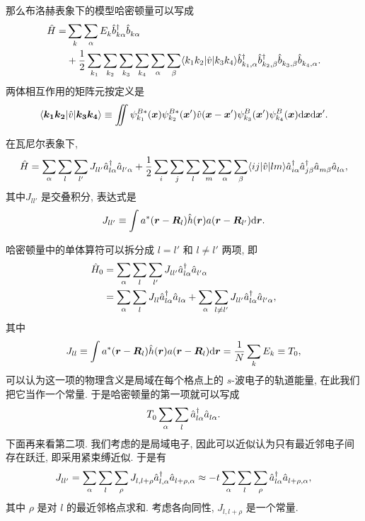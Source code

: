 那么布洛赫表象下的模型哈密顿量可以写成
\begin{align}
      \hat H=&\sum_{ k}\sum_{\alpha}E^{}_{k}\hat b_{ k\alpha}^\dagger \hat b_{k\alpha}^{}\nonumber\\
      &+\frac{1}{2}\sum_{ k_1}\sum_{k_2}\sum_{k_3}\sum_{ k_4}\sum_\alpha\sum_\beta\langle k_1 k_2|\hat v| k_3 k_4 \rangle\hat b_{k_1, \alpha}^\dagger \hat b_{k_2, \beta}^\dagger \hat b_{k_3, \beta}^{}\hat b_{k_4, \alpha}^{}. 
   \end{align}
两体相互作用的矩阵元按定义是
\begin{equation}
   \langle \boldsymbol{k_1k_2}|\hat v |\boldsymbol{k_3k_4} \rangle\equiv \iint \psi_{{k_1}}^{B*}(\boldsymbol{x})\psi_{{k_2}}^{B*}(\boldsymbol{x}')\hat{v}(\boldsymbol{x}-\boldsymbol{x}')\psi_{k_3}^B(\boldsymbol{x}')\psi_{k_4}^B(\boldsymbol{x})\mathrm{d}\boldsymbol{x}\mathrm{d}\boldsymbol{x}'. 
\end{equation}

在瓦尼尔表象下,
\begin{equation} \hat H=\sum_\alpha\sum_l\sum_{l'}J^{}_{ll'}\hat a_{l\alpha}^\dagger \hat a_{l'\alpha}^{ }+\frac{1}{2}\sum_{i}\sum_{j}\sum_{l}\sum_{m}\sum_{\alpha}\sum_{\beta}\langle ij |\hat v|lm\rangle \hat{a}^{\dagger}_{i\alpha}\hat{a}^{\dagger}_{j\beta}\hat{a}^{}_{m\beta}\hat{a}^{}_{l\alpha},\end{equation}
其中$J_{ll'}$ 是交叠积分, 表达式是
\begin{equation}
   J_{ll'}\equiv \int a^*(\boldsymbol{r}-\boldsymbol{R}_l)\hat h(\boldsymbol{r})a(\boldsymbol{r}-\boldsymbol{R}_{l'})\mathrm{d}\boldsymbol{r}. 
\end{equation}

哈密顿量中的单体算符可以拆分成 $l=l'$ 和 $l\ne l'$ 两项, 即
   \begin{align}
      \hat H_0&=\sum_\alpha\sum_l\sum_{l'}J^{}_{ll'}\hat a_{l\alpha}^\dagger \hat a_{l'\alpha}^{ }\nonumber\\
      &=\sum_{\alpha}\sum_{l}J^{}_{ll}\hat a_{l\alpha}^\dagger \hat a_{l\alpha}^{ }+\sum_\alpha\sum_{l\ne l'}J^{}_{ll'}\hat a_{l\alpha}^\dagger \hat a_{l'\alpha}^{ }, 
   \end{align}
其中
\begin{equation}
   J_{ll}\equiv \int a^*(\boldsymbol{r}-\boldsymbol{R}_l)\hat h(\boldsymbol{r})a(\boldsymbol{r}-\boldsymbol{R}_l)\mathrm{d}\boldsymbol{r}=\frac{1}{N}\sum_{ k}E_{k}\equiv T_0, 
\end{equation}
可以认为这一项的物理含义是局域在每个格点上的 $s$-波电子的轨道能量, 在此我们把它当作一个常量. 于是哈密顿量的第一项就可以写成
\begin{equation}
   T^{}_0\sum_\alpha \sum_l\hat a_{l\alpha}^\dagger \hat a_{l\alpha}^{}. 
\end{equation}
下面再来看第二项. 我们考虑的是局域电子, 因此可以近似认为只有最近邻电子间存在跃迁, 即采用紧束缚近似. 于是有
\begin{equation}
   J^{}_{ll'}=\sum_{\alpha}\sum_l\sum_\rho J^{}_{l, l+\rho}\hat a_{l, \alpha}^\dagger \hat a^{}_{l+\rho, \alpha}\approx -t\sum_\alpha\sum_l\sum_\rho \hat a_{l\alpha}^\dagger \hat a^{}_{l+\rho, \alpha}, 
\end{equation}
其中 $\rho$ 是对 $l$ 的最近邻格点求和. 考虑各向同性, $J_{l, l+\rho}$ 是一个常量. 

